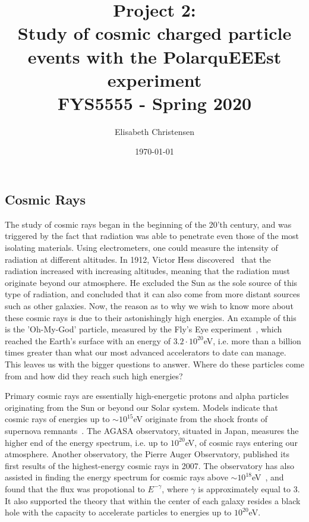 \documentclass[12pt,a4paper]{amsart}
\title[Charged particles study with PolarquEEEst]{Project 2: \\Study of cosmic charged particle events with the PolarquEEEst experiment\\
\small{\mdseries FYS5555 - Spring 2020}}
\date{\today}
\author[Christensen]{Elisabeth Christensen}
\begin{document}
\maketitle
\setcounter{section}{1}
\setcounter{subsection}{0}
\subsection{Cosmic Rays}
The study of cosmic rays began in the beginning of the 20'th century, and was triggered by the fact that radiation was able to penetrate even those of the most isolating materials. Using electrometers, one could measure the intensity of radiation at different altitudes. In 1912, Victor Hess discovered~\cite{Hess1912} that the radiation increased with increasing altitudes, meaning that the radiation must originate beyond our atmosphere. He excluded the Sun as the sole source of this type of radiation, and concluded that it can also come from more distant sources such as other galaxies. Now, the reason as to why we wish to know more about these cosmic rays is due to their astonishingly high energies. An example of this is the 'Oh-My-God' particle, measured by the Fly's Eye experiment~\cite{OhMyGodParticle}, which reached the Earth's surface with an energy of $3.2\cdot 10^{20}$eV, i.e. more than a billion times greater than what our most advanced accelerators to date can manage. This leaves us with the bigger questions to answer. Where do these particles come from and how did they reach such high energies?

Primary cosmic rays are essentially high-energetic protons and alpha particles originating from the Sun or beyond our Solar system. Models indicate that cosmic rays of energies up to $\sim 10^{15}$eV originate from the shock fronts of supernova remnants~\cite{Ellison1997}. The AGASA observatory, situated in Japan, measures the higher end of the energy spectrum, i.e. up to $10^{20}$eV, of cosmic rays entering our atmosphere. Another observatory, the Pierre Auger Observatory, published its first results of the highest-energy cosmic rays in 2007. The observatory has also assisted in finding the energy spectrum for cosmic rays above $\sim 10^{18}$eV~\cite{Auger2010}, and found that the flux was propotional to $E^{-\gamma}$, where $\gamma$ is approximately equal to 3. It also supported the theory that within the center of each galaxy resides a black hole with the capacity to accelerate particles to energies up to $10^{20}$eV.
\end{document}
